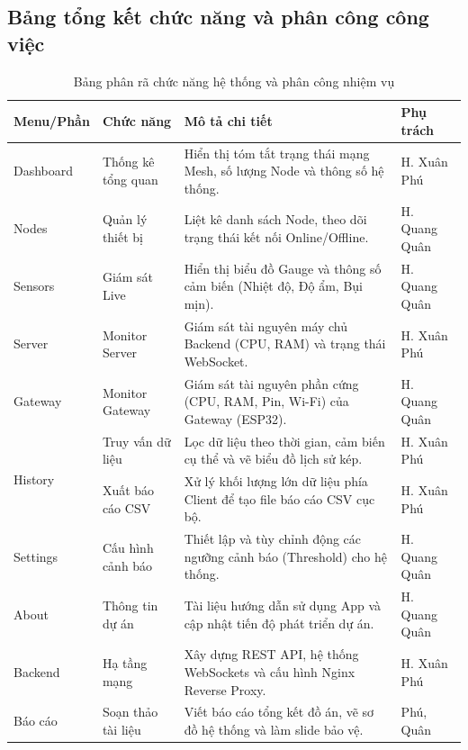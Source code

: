 \documentclass{article}
\begin{document}
\subsection{Bảng tổng kết chức năng và phân công công việc}
\begin{table}[H]
    \centering
    \renewcommand{\arraystretch}{1.1}
    \begin{tabularx}{\textwidth}{|l|l|X|l|}
        \hline
        \textbf{Menu/Phần} & \textbf{Chức năng} & \textbf{Mô tả chi tiết} & \textbf{Phụ trách} \\
        \hline
        Dashboard & Thống kê tổng quan & Hiển thị tóm tắt trạng thái mạng Mesh, số lượng Node và thông số hệ thống. & H. Xuân Phú \\
        \hline
        Nodes & Quản lý thiết bị & Liệt kê danh sách Node, theo dõi trạng thái kết nối Online/Offline. & H. Quang Quân \\
        \hline
        Sensors & Giám sát Live & Hiển thị biểu đồ Gauge và thông số cảm biến (Nhiệt độ, Độ ẩm, Bụi mịn). & H. Quang Quân \\
        \hline
        Server & Monitor Server & Giám sát tài nguyên máy chủ Backend (CPU, RAM) và trạng thái WebSocket. & H. Xuân Phú \\
        \hline
        Gateway & Monitor Gateway & Giám sát tài nguyên phần cứng (CPU, RAM, Pin, Wi-Fi) của Gateway (ESP32). & H. Quang Quân \\
        \hline
        \multirow{2}{*}{History} & Truy vấn dữ liệu & Lọc dữ liệu theo thời gian, cảm biến cụ thể và vẽ biểu đồ lịch sử kép. & H. Xuân Phú \\ \cline{2-4}
        & Xuất báo cáo CSV & Xử lý khối lượng lớn dữ liệu phía Client để tạo file báo cáo CSV cục bộ. & H. Xuân Phú \\
        \hline
        Settings & Cấu hình cảnh báo & Thiết lập và tùy chỉnh động các ngưỡng cảnh báo (Threshold) cho hệ thống. & H. Quang Quân \\
        \hline
        About & Thông tin dự án & Tài liệu hướng dẫn sử dụng App và cập nhật tiến độ phát triển dự án. & H. Quang Quân \\
        \hline
        Backend & Hạ tầng mạng & Xây dựng REST API, hệ thống WebSockets và cấu hình Nginx Reverse Proxy. & H. Xuân Phú \\
        \hline
        Báo cáo & Soạn thảo tài liệu & Viết báo cáo tổng kết đồ án, vẽ sơ đồ hệ thống và làm slide bảo vệ. & Phú, Quân \\
        \hline
    \end{tabularx}
    \caption{Bảng phân rã chức năng hệ thống và phân công nhiệm vụ}
\end{table}
\end{document}
